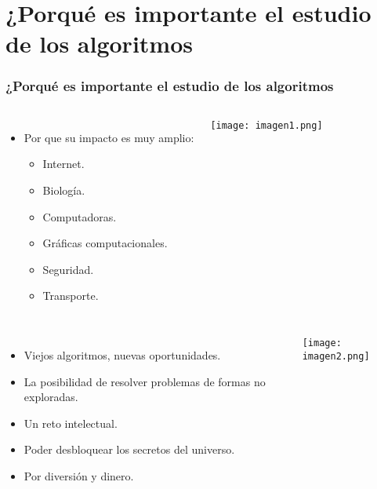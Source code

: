 \documentclass[aspectratio=169]{beamer}
\begin{document}
\section{¿Porqué es importante el estudio de los algoritmos} %

\begin{frame}
\frametitle{¿Porqué es importante el estudio de los algoritmos}
\begin{columns}[c] %
	
	\begin{itemize}
		\item Por que su impacto es muy amplio:
		\begin{itemize}
			\item Internet.
			\item Biología.
			\item Computadoras.
			\item Gráficas computacionales.
			\item Seguridad.
			\item Transporte.
		\end{itemize}
	\end{itemize}
	
	\begin{flushleft}
		\texttt{[image: imagen1.png]}
	\end{flushleft}
\end{columns}
\end{frame}

\begin{frame}
\begin{columns}[c] %
	\begin{itemize}
		\item Viejos algoritmos, nuevas oportunidades.
		\item La posibilidad de resolver problemas de formas no exploradas.
		\item Un reto intelectual.
		\item Poder desbloquear los secretos del universo.
		\item Por diversión y dinero.
	\end{itemize}
	
	\begin{flushleft}
		\texttt{[image: imagen2.png]}
	\end{flushleft}
	
\end{columns}
\end{frame}
\end{document}
